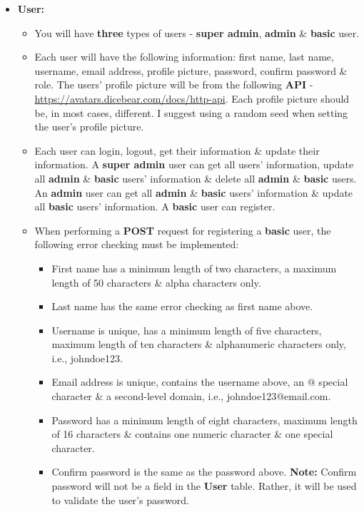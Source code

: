 \documentclass{article}
\begin{document}
\begin{itemize}
	\item \textbf{User:}
	\begin{itemize}
		\item You will have \textbf{three} types of users - \textbf{super admin}, \textbf{admin} \& \textbf{basic} user.
		\item Each user will have the following information: first name, last name, username, email address, profile picture, password, confirm password \& role. The users' profile picture will be from the following \textbf{API} - \href{https://avatars.dicebear.com/docs/http-api}{https://avatars.dicebear.com/docs/http-api}. Each profile picture should be, in most cases, different. I suggest using a random seed when setting the user's profile picture.
		\item Each user can login, logout, get their information \& update their information. A \textbf{super admin} user can get all users' information, update all \textbf{admin} \& \textbf{basic} users' information \& delete all \textbf{admin} \& \textbf{basic} users. An \textbf{admin} user can get all \textbf{admin} \& \textbf{basic} users' information \& update all \textbf{basic} users' information. A \textbf{basic} user can register.
		\item When performing a \textbf{POST} request for registering a \textbf{basic} user, the following error checking must be implemented:
		\begin{itemize}
			\item First name has a minimum length of two characters, a maximum length of 50 characters \& alpha characters only.
			\item Last name has the same error checking as first name above.
			\item Username is unique, has a minimum length of five characters, maximum length of ten characters \& alphanumeric characters only, i.e., johndoe123.
			\item Email address is unique, contains the username above, an @ special character \& a second-level domain, i.e., johndoe123@email.com.
			\item Password has a minimum length of eight characters, maximum length of 16 characters \& contains one numeric character \& one special character.
			\item Confirm password is the same as the password above. \textbf{Note:} Confirm password will not be a field in the \textbf{User} table. Rather, it will be used to validate the user's password.

\end{itemize}
\end{itemize}
\end{itemize}
\end{document}
